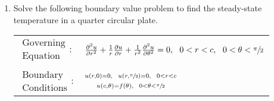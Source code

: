 \begin{fullwidth}
\begin{enumerate}
\item Solve the following boundary value problem to find the steady-state temperature in a quarter circular plate.
\begin{table}[h]
\begin{tabular}{l l}
$\substack{\text{Governing} \\\text{Equation}}: $& $\frac{\partial^2 u}{\partial r^2} + \frac{1}{r}\frac{\partial u}{\partial r} + \frac{1}{r^2}\frac{\partial^2 u}{\partial \theta^2}= 0, \ \ 0<r<c, \ \ 0<\theta< \sfrac{\pi}{2} $\\
& \\
$\substack{\text{Boundary} \\ \text{Conditions}}: $ & $\substack{u(r,0) = 0, \ \ u(r,\sfrac{\pi}{2}) = 0, \ \ 0<r<c \\ \\ u(c,\theta) = f(\theta), \ \ 0 < \theta < \sfrac{\pi}{2} }$\\
\end{tabular}
\end{table} 

\end{enumerate}
\end{fullwidth}





